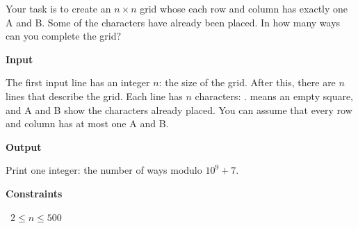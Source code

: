 Your task is to create an $n \times n$ grid whose each row and column has exactly one A and B. Some of the characters have already been placed. In how many ways can you complete the grid?

\vspace{0.3cm}\noindent\textbf{Input}

The first input line has an integer $n$: the size of the grid.
After this, there are $n$ lines that describe the grid. Each line has $n$ characters: . means an empty square, and A and B show the characters already placed.
You can assume that every row and column has at most one A and B.

\vspace{0.3cm}\noindent\textbf{Output}

Print one integer: the number of ways modulo $10^9+7$.

\vspace{0.3cm}\noindent\textbf{Constraints}

\textbullet\ $2 \le n \le 500$